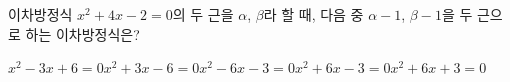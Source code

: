 이차방정식 $x^2+4x-2=0$의 두 근을 $\alpha$, $\beta$라 할 때, 다음 중 $\alpha-1$, $\beta-1$을 두 근으로 하는 이차방정식은?
\begin{choicesii}{$x^2-3x+6=0$}{$x^2+3x-6=0$}{$x^2-6x-3=0$}{$x^2+6x-3=0$}{$x^2+6x+3=0$}\end{choicesii}
